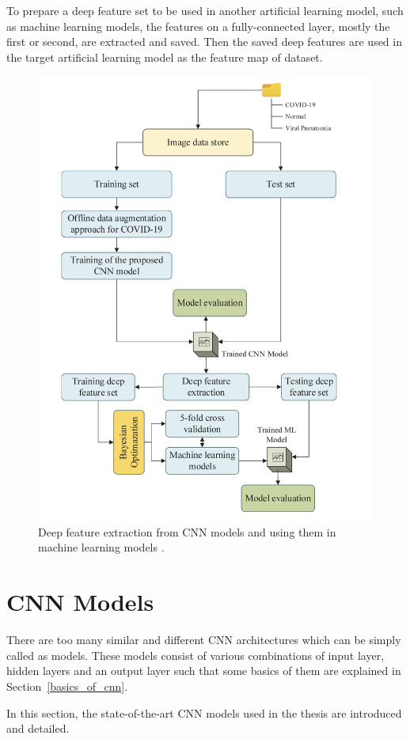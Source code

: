 To prepare a deep feature set to be used in another artificial learning model, such as machine learning models, the features on a fully-connected layer, mostly the first or second, are extracted and saved. Then the saved deep features are used in the target artificial learning model as the feature map of dataset.

\begin{figure}[h]
	\centering
	\includegraphics[width=.8\linewidth]{fig/deepfeauter_usage.png}
	\caption{Deep feature extraction from CNN models and using them in machine learning models \cite{A_novelCNNModel}.}
	\label{fig:A_novelCNNModel_architecture}
\end{figure}

\section{CNN Models}

There are too many similar and different CNN architectures which can be simply called as models. These models consist of various combinations of input layer, hidden layers and an output layer such that some basics of them are explained in Section~\ref{basics_of_cnn}.

In this section, the state-of-the-art CNN models used in the thesis are introduced and detailed.

